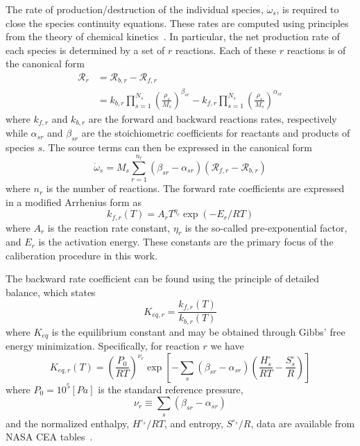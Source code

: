 The rate of production/destruction of the individual species,
$\dot{\omega}_s$, is required to close the species continuity
equations.  These rates are computed using principles from the theory
of chemical kinetics~\cite{Kee}. In particular, the net production rate of each
species is determined by a set of $r$ reactions.
Each of these $r$ reactions is of the canonical form
\begin{align}
  \mathcal{R}_r &= \mathcal{R}_{b,r} - \mathcal{R}_{f,r} \\ &= k_{b,r}
  \prod_{s=1}^{N_s} \left(\frac{\rho_s}{M_s}\right)^{\beta_{sr}} -
  k_{f,r} \prod_{s=1}^{N_s}
  \left(\frac{\rho_s}{M_s}\right)^{\alpha_{sr}}
\end{align}
where $k_{f,r}$ and $k_{b,r}$ are the forward and backward reactions
rates, respectively while $\alpha_{sr}$ and $\beta_{sr}$ are the
stoichiometric coefficients for reactants and products of species $s$.
The source terms can then be expressed in the canonical form
%
\begin{equation}
  \dot{\omega}_s = M_s \sum_{r=1}^{n_r}\left(\beta_{sr}-\alpha_{sr}\right)\left(\mathcal{R}_{f,r} - \mathcal{R}_{b,r}\right)
\end{equation}
%
where $n_r$ is the number of reactions.
The forward rate coefficients are expressed in a modified Arrhenius form as
%
\begin{equation}\label{eq:arrhenius}
  k_{f,r}\left(T\right) = A_{r} T^{\eta_r} \exp \left(-E_{r}/RT\right)
\end{equation}
%
where
$ A_{r}$ is the reaction rate constant, $\eta_r$ is the so-called pre-exponential factor, and $E_{r}$ is the activation energy.
These constants are the primary focus of the caliberation procedure in this work.

%
The backward rate coefficient can be found using the principle of detailed balance, which states
\begin{equation}
  \label{eq:k_br}
  K_{eq,r} = \frac{k_{f,r}\left(T\right)}{k_{b,r}\left(T\right)}
\end{equation}
%
where $K_{eq}$ is the equilibrium constant and may be obtained through Gibbs' free energy minimization. Specifically, for reaction $r$ we have
%
\begin{equation}
  \label{eq:k_eq}
  K_{eq,r}\left(T\right) =
  \left(\frac{P_0}{RT}\right)^{\nu_r}\exp\left[-\sum_s\left(\beta_{sr}-\alpha_{sr}\right)\left(\frac{H^\circ_s}{RT} - \frac{S^\circ_s}{R}\right)\right]
\end{equation}
%
where $P_0= 10^5 [Pa]$ is the standard reference pressure,
%
\begin{equation}
  \nu_r \equiv \sum_s\left(\beta_{sr}-\alpha_{sr}\right)
\end{equation}
%
and the normalized enthalpy, $H^{\circ_s}/RT$, and entropy, $S^{\circ_s}/R$, data are available from NASA CEA tables~\cite{CEATables}.

